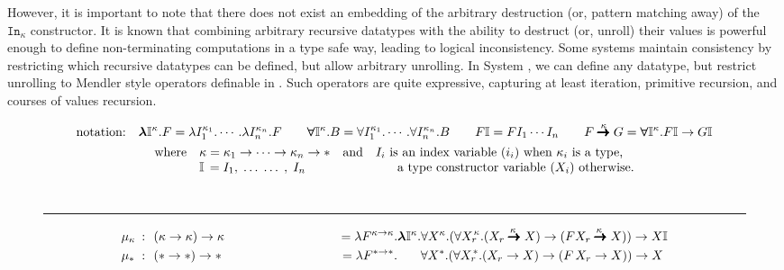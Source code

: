 However, it is important to note that there does not exist an embedding of the
arbitrary destruction (or, pattern matching away) of the $\mathtt{In}_\kappa$
constructor. It is known that combining arbitrary recursive datatypes with
the ability to destruct (or, unroll) their values
is powerful enough to define non-terminating computations in a type safe way,
leading to logical inconsistency. Some systems maintain consistency by restricting
which recursive datatypes can be defined, but allow arbitrary unrolling. In System
\Fi, we can define any datatype, but restrict unrolling to Mendler style operators
definable in \Fi. Such operators are quite expressive, capturing at least
iteration, primitive recursion, and courses of values recursion.

\begin{landscape}
\begin{figure}
\begin{singlespace}
\begin{multline*} \text{notation:}\quad
   \boldsymbol{\lambda}\mathbb{I}^\kappa.F =
	\lambda I_1^{\kappa_1}.\cdots.\lambda I_n^{\kappa_n}.F \qquad
   \boldsymbol{\forall}\mathbb{I}^\kappa.B =
	\forall I_1^{\kappa_1}.\cdots.\forall I_n^{\kappa_n}.B \qquad
   F\mathbb{I} = F I_1 \cdots I_n \qquad
   F \stackrel{\kappa}{\pmb{\pmb{->}}} G =
	\boldsymbol{\forall}\mathbb{I}^\kappa.F\mathbb{I} -> G\mathbb{I} \\
\begin{array}{lll}
\text{where}
 	& \kappa = \kappa_1 -> \cdots -> \kappa_n -> * & \text{and} ~~~
 	\text{$I_i$ is an index variable ($i_i$) when $\kappa_i$ is a type,}
 		\\
 	& \mathbb{I}\,=I_1,\;\dots\;\dots\;,\;I_n& \qquad~\qquad
 	\text{a type constructor variable ($X_i$) otherwise.}
\end{array}
\end{multline*} ~ \vspace*{-5pt}
\hrule  \vspace*{-2pt}
\begin{align*}
&\mu_\kappa &\!\!\!\!\!~:~~& (\kappa -> \kappa) -> \kappa
  \qquad\qquad\qquad\qquad\quad
  = \l F^{\kappa -> \kappa}.\boldsymbol{\l}\mathbb{I}^\kappa.
  \forall X^\kappa.
  (\forall {X_r}^{\!\!\kappa}.
  	(X_r \stackrel{\kappa\;}{\pmb{\pmb{->}}} X) ->
	(F X_r \stackrel{\kappa\;}{\pmb{\pmb{->}}} X)) -> X\mathbb{I} \\
&\mu_{*} &\!\!\!\!\!~:~~& (* -> *) -> * 
 \qquad\qquad\qquad\qquad\quad~
 = \l F^{* -> *}.\phantom{\boldsymbol{\l}\mathbb{I}^\kappa.}
 \forall X^{*}.(\forall {X_r}^{\!\!*}.(X_r -> X) -> (F\,X_r -> X)) -> X \\

\end{align*}
\end{singlespace}
\end{figure}
\end{landscape}
